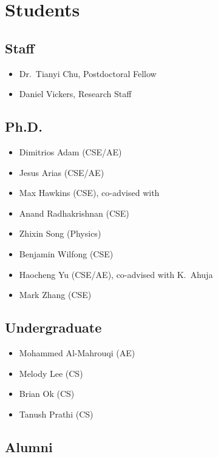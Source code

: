 \section{Students}

\subsection{Staff}

\begin{itemize}
    \item Dr.\ Tianyi Chu, Postdoctoral Fellow
    \item Daniel Vickers, Research Staff
\end{itemize}

\subsection{Ph.D.}

\begin{itemize}
    \item Dimitrios Adam (CSE/AE)
    \item Jesus Arias (CSE/AE)
    \item Max Hawkins (CSE), co-advised with \Rich
    \item Anand Radhakrishnan (CSE)
    \item Zhixin Song (Physics)
    \item Benjamin Wilfong (CSE)
    \item Haocheng Yu (CSE/AE), co-advised with K.\ Ahuja
    \item Mark Zhang (CSE)
\end{itemize}

\subsection{Undergraduate}

\begin{itemize}
    \item Mohammed Al-Mahrouqi (AE)
    \item Melody Lee (CS)
    \item Brian Ok (CS)
    \item Tanush Prathi (CS)
\end{itemize}

\subsection{Alumni}

